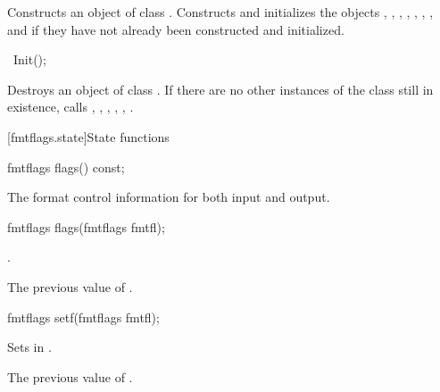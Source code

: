 \begin{itemdescr}
\pnum
\effects
Constructs an object of class
.
Constructs and initializes the objects , , ,
, , , , and  if
they have not already been constructed and initialized.
\end{itemdescr}

%
\begin{itemdecl}
~Init();
\end{itemdecl}

\begin{itemdescr}
\pnum
\effects
Destroys an object of class
.
If there are no other instances of the class still in existence,
calls
%
,
,
,
,
,
.
\end{itemdescr}

[fmtflags.state]{State functions}

%
\begin{itemdecl}
fmtflags flags() const;
\end{itemdecl}

\begin{itemdescr}
\pnum
\returns
The format control information for both input and output.
\end{itemdescr}

%
\begin{itemdecl}
fmtflags flags(fmtflags fmtfl);
\end{itemdecl}

\begin{itemdescr}
\pnum
\ensures
{}.

\pnum
\returns
The previous value of
.
\end{itemdescr}

%
\begin{itemdecl}
fmtflags setf(fmtflags fmtfl);
\end{itemdecl}

\begin{itemdescr}
\pnum
\effects
Sets  in
.

\pnum
\returns
The previous value of
.
\end{itemdescr}

